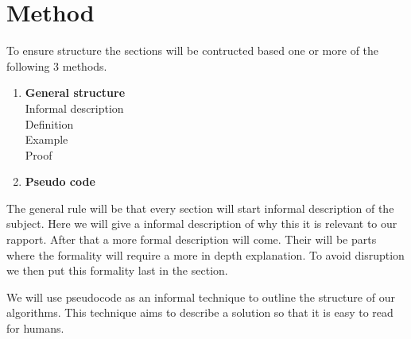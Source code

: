 \section{Method}
To ensure structure the sections will be contructed based one or more of the following 3 methods.
\begin{enumerate}
    \item \textbf{General structure}  \\
    Informal description\\
    Definition\\
    Example\\
    Proof    
    \item \textbf{Pseudo code} 
\end{enumerate}

 The general rule will be that every section will start informal description of the subject. Here we will give a informal description of why this it is relevant to our rapport. After that a more formal description will come. Their will be parts where the formality will require a more in depth explanation. To avoid disruption we then put this formality last in the section.    

 We will use pseudocode as an informal technique to outline the structure of our algorithms. This technique aims to describe a solution so that it is easy to read for humans.



